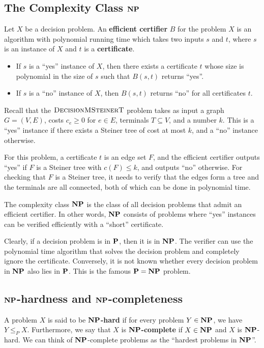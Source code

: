 \subsection{The Complexity Class $\mathbf{NP}$} \label{subsec:6.3}
Let $X$ be a decision problem. An {\bf efficient certifier} $B$ for the 
problem $X$ is an algorithm with polynomial running time which takes 
two inputs $s$ and $t$, where $s$ is an instance of $X$ and $t$ is a 
{\bf certificate}. 
\begin{itemize}
    \item If $s$ is a ``yes'' instance of $X$, then there exists a certificate 
    $t$ whose size is polynomial in the size of $s$ such that $B(s, t)$ 
    returns ``yes''.
    \item If $s$ is a ``no'' instance of $X$, then $B(s, t)$ returns ``no'' 
    for all certificates $t$. 
\end{itemize}
Recall that the $\textsc{DecisionMSteinerT}$ problem takes as input a 
graph $G = (V, E)$, costs $c_e \geq 0$ for $e \in E$, terminals $T \subseteq V$, 
and a number $k$. This is a ``yes'' instance if there exists a Steiner tree 
of cost at most $k$, and a ``no'' instance otherwise. 

For this problem, 
a certificate $t$ is an edge set $F$, and the efficient certifier 
outputs ``yes'' if $F$ is a Steiner tree with $c(F) \leq k$, and outputs ``no'' 
otherwise. For checking that $F$ is a Steiner tree, it needs to verify that 
the edges form a  tree and the terminals are all connected, both of which can be 
done in polynomial time.

The complexity class $\mathbf{NP}$ is the class of all decision problems that admit 
an efficient certifier. In other words, $\mathbf{NP}$ consists of problems where 
``yes'' instances can be verified efficiently with a ``short'' certificate.

Clearly, if a decision problem is in $\mathbf{P}$, then it is in $\mathbf{NP}$. 
The verifier can use the polynomial time algorithm that solves the 
decision problem and completely ignore the certificate.
Conversely, it is not known whether every decision problem in $\mathbf{NP}$ 
also lies in $\mathbf{P}$. This is the famous $\mathbf{P} = \mathbf{NP}$ problem. 

\subsection{$\mathbf{NP}$-hardness and $\mathbf{NP}$-completeness} \label{subsec:6.4}
A problem $X$ is said to be {\bf $\mathbf{NP}$-hard} if for every problem $Y \in \mathbf{NP}$, 
we have $Y \leq_P X$. Furthermore, we say that $X$ is {\bf $\mathbf{NP}$-complete} if $X \in \mathbf{NP}$ 
and $X$ is $\mathbf{NP}$-hard. We can think of $\mathbf{NP}$-complete problems as the 
``hardest problems in $\mathbf{NP}$''.

